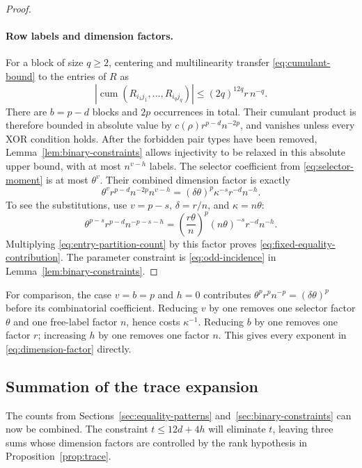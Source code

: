 \documentclass[11pt]{article}
\theoremstyle{definition}
\theoremstyle{remark}
\theoremstyle{plain}
\DeclareMathOperator{\cum}{cum}
\begin{document}
\begin{proof}
\paragraph{Row labels and dimension factors.}
For a block of size $q\ge2$, centering and multilinearity transfer
\eqref{eq:cumulant-bound} to the entries of $R$ as
\[
 \left|\cum(R_{i_1j_1},\ldots,R_{i_qj_q})\right|
       \le(2q)^{12q}r\,n^{-q}.
\]
There are $b=p-d$ blocks and $2p$ occurrences in total. Their
cumulant product is therefore bounded in absolute value by
$c(\rho)r^{p-d}n^{-2p}$, and vanishes unless every XOR condition
holds. After the forbidden pair
types have been removed, Lemma~\ref{lem:binary-constraints} allows
injectivity to be relaxed in this absolute upper bound, with at
most $n^{v-h}$ labels. The selector coefficient from
\eqref{eq:selector-moment} is at most $\theta^v$.
Their combined dimension factor is exactly
\begin{equation}\label{eq:dimension-factor}
 \theta^v r^{p-d}n^{-2p}n^{v-h}
            =(\delta\theta)^p\kappa^{-s}r^{-d}n^{-h}.
\end{equation}
To see the substitutions, use $v=p-s$, $\delta=r/n$, and
$\kappa=n\theta$:
\[
 \theta^{p-s}r^{p-d}n^{-p-s-h}
       =\left(\frac{r\theta}{n}\right)^p
          (n\theta)^{-s}r^{-d}n^{-h}.
\]
Multiplying \eqref{eq:entry-partition-count} by this factor proves
\eqref{eq:fixed-equality-contribution}. The parameter constraint is
\eqref{eq:odd-incidence} in Lemma~\ref{lem:binary-constraints}.
\end{proof}

For comparison, the case $v=b=p$ and $h=0$ contributes
$\theta^pr^pn^{-p}=(\delta\theta)^p$ before its combinatorial
coefficient. Reducing $v$ by one removes one selector factor
$\theta$ and one free-label factor $n$, hence costs $\kappa^{-1}$.
Reducing $b$ by one removes one factor $r$; increasing $h$ by one
removes one factor $n$. This gives every exponent in
\eqref{eq:dimension-factor} directly.

\subsection{Summation of the trace expansion}\label{sec:trace-summation}

The counts from Sections~\ref{sec:equality-patterns}
and~\ref{sec:binary-constraints} can now be combined. The constraint $t\le12d+4h$
will eliminate $t$, leaving three sums whose dimension factors
are controlled by the rank hypothesis in Proposition~\ref{prop:trace}.
\end{document}
